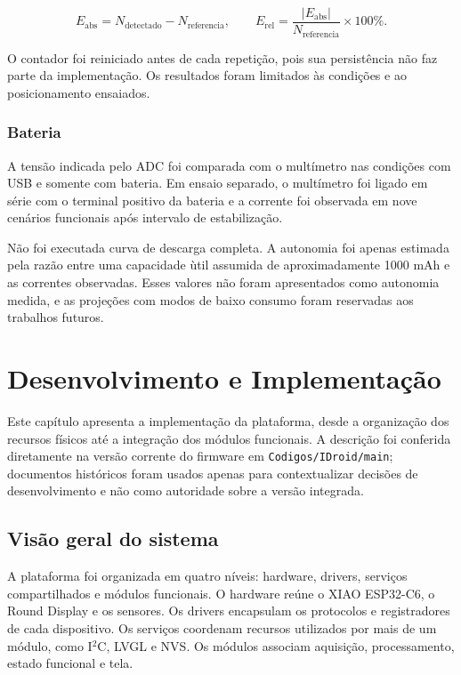 \documentclass[a4paper,12pt]{article}
\begin{document}
\[
E_{\mathrm{abs}}=N_{\mathrm{detectado}}-N_{\mathrm{referencia}},
\qquad
E_{\mathrm{rel}}=\frac{|E_{\mathrm{abs}}|}{N_{\mathrm{referencia}}}\times 100\%.
\]


O contador foi reiniciado antes de cada repeti\c{c}\~ao, pois sua persist\^encia n\~ao faz parte da implementa\c{c}\~ao. Os resultados foram limitados \`as condi\c{c}\~oes e ao posicionamento ensaiados.


\subsubsection{Bateria}

A tens\~ao indicada pelo ADC foi comparada com o mult\'imetro nas condi\c{c}\~oes com USB e somente com bateria. Em ensaio separado, o mult\'imetro foi ligado em s\'erie com o terminal positivo da bateria e a corrente foi observada em nove cen\'arios funcionais ap\'os intervalo de estabiliza\c{c}\~ao.

N\~ao foi executada curva de descarga completa. A autonomia foi apenas estimada pela raz\~ao entre uma capacidade \`util assumida de aproximadamente 1000 mAh e as correntes observadas. Esses valores n\~ao foram apresentados como autonomia medida, e as proje\c{c}\~oes com modos de baixo consumo foram reservadas aos trabalhos futuros.

\clearpage
\section{Desenvolvimento e Implementa\c{c}\~ao}


Este cap\'itulo apresenta a implementa\c{c}\~ao da plataforma, desde a organiza\c{c}\~ao dos recursos f\'isicos at\'e a integra\c{c}\~ao dos m\'odulos funcionais. A descri\c{c}\~ao foi conferida diretamente na vers\~ao corrente do firmware em \texttt{Codigos/IDroid/main}; documentos hist\'oricos foram usados apenas para contextualizar decis\~oes de desenvolvimento e n\~ao como autoridade sobre a vers\~ao integrada.


\subsection{Vis\~ao geral do sistema}


A plataforma foi organizada em quatro n\'iveis: hardware, drivers, servi\c{c}os compartilhados e m\'odulos funcionais. O hardware re\'une o XIAO ESP32-C6, o Round Display e os sensores. Os drivers encapsulam os protocolos e registradores de cada dispositivo. Os servi\c{c}os coordenam recursos utilizados por mais de um m\'odulo, como I$^2$C, LVGL e NVS. Os m\'odulos associam aquisi\c{c}\~ao, processamento, estado funcional e tela.
\end{document}
